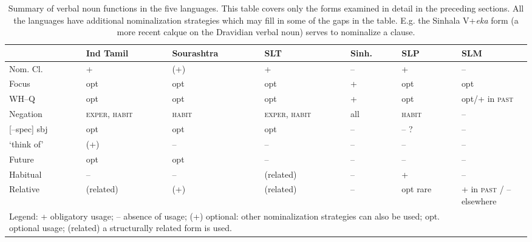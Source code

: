 \begin{table}
\begin{tabular}{llllllp{2cm}}
	      & Ind Tamil & Sourashtra & SLT & Sinh. & SLP & SLM\\
\hline
Nom. Cl.	& +		&(+)	&+	&--	&+	&--\\
Focus      	&opt		& opt 	&opt	&+   	&opt	&opt\\
WH--Q		&opt   	&opt 	&opt 	&+   	&opt	&opt/+ in \textsc{past}\\
Negation   	&\textsc{exper}, \textsc{habit}	&\textsc{habit}	&\textsc{exper}, 
					\textsc{habit}	&all	&\textsc{habit}	&--\\
{}[--spec] sbj	&opt		&opt	&opt	&--	&-- ?	&-- \\
`think of'	&(+)		&--	&--	&--	&--	&--\\
Future		&opt		&opt	&--	&--	&--	&--\\
Habitual	&--		&--	&(related)&--	&+	&--\\
Relative	&(related)	&(+)	&(related)&--	&opt rare&+ in \textsc{past} /
-- elsewhere\\
\hline
\multicolumn{6}{l}{\parbox{10cm}{
 Legend:
 + obligatory usage;
 -- absence of usage;
 (+) optional: other nominalization strategies can also be used;
 opt. optional usage;
 (related) a structurally related form is used.
}}

\end{tabular}

\caption[Summary of verbal noun functions in the five languages]{Summary of verbal noun functions in the five languages. This table covers only the forms examined in detail in the preceding sections.  All the languages have additional nominalization strategies which may fill in some of the gaps in the table.  E.g. the Sinhala V+{\em eka} form (a more recent calque on the Dravidian verbal noun) serves to nominalize a clause.}
\label{smith:tab:3} 
\end{table}


 
 

